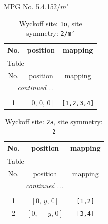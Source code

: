 \documentclass[fleqn,8pt]{jsarticle}
\begin{document}
\setcounter{MaxMatrixCols}{32}

\renewcommand{\tablename}{Table~}
\renewcommand{\figurename}{Figure~}
\begin{center}
\LARGE
MPG No. 5.4.15\quad$2/m'$
\end{center}
\renewcommand{\arraystretch}{1.2}
\begin{longtable}{ccc}
\caption{Wyckoff site: {\tt 1o}, site symmetry: {\tt 2/m'}}
 \\
 \hline \hline
No. & position & mapping \\ \hline \endfirsthead

\multicolumn{2}{l}{\tablename\ \thetable{}} \\
 \hline \hline
No. & position & mapping \\ \hline \endhead

 \hline \hline
\multicolumn{2}{r}{\footnotesize\it continued ...} \\ \endfoot

 \hline \hline
\multicolumn{2}{r}{} \\ \endlastfoot

1 & $\left[ 0,\, 0,\, 0 \right]$ & {\tt [1,2,3,4]} \\
\end{longtable}
\renewcommand{\arraystretch}{1.2}
\begin{longtable}{ccc}
\caption{Wyckoff site: {\tt 2a}, site symmetry: {\tt 2}}
 \\
 \hline \hline
No. & position & mapping \\ \hline \endfirsthead

\multicolumn{2}{l}{\tablename\ \thetable{}} \\
 \hline \hline
No. & position & mapping \\ \hline \endhead

 \hline \hline
\multicolumn{2}{r}{\footnotesize\it continued ...} \\ \endfoot

 \hline \hline
\multicolumn{2}{r}{} \\ \endlastfoot

1 & $\left[ 0,\, y,\, 0 \right]$ & {\tt [1,2]} \\ \hline
2 & $\left[ 0,\, - y,\, 0 \right]$ & {\tt [3,4]} \\
\end{longtable}
\renewcommand{\arraystretch}{1.2}
\end{document}

